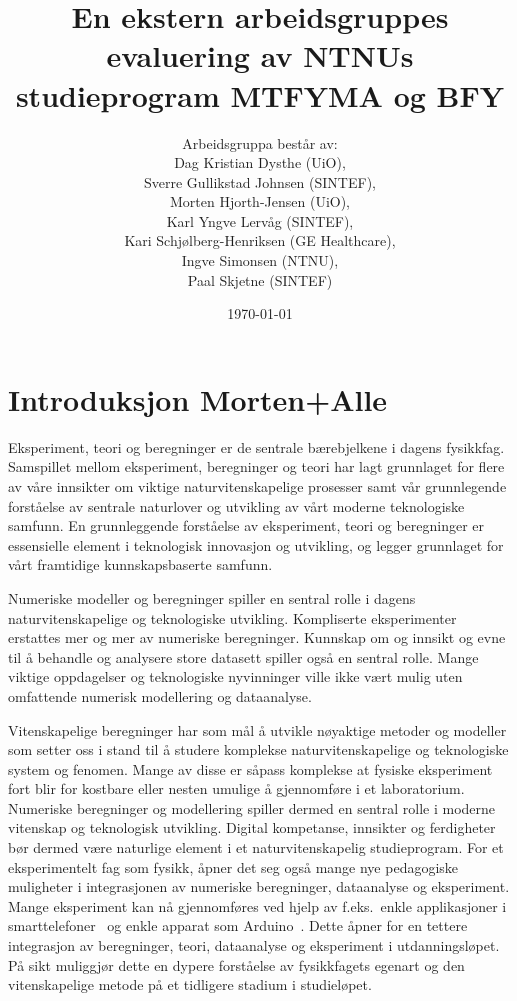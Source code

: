 \documentclass{article}
\title{En ekstern arbeidsgruppes evaluering av NTNUs studieprogram MTFYMA og BFY}
\author{Arbeidsgruppa består av: \\ Dag Kristian Dysthe (UiO), \\ Sverre Gullikstad Johnsen (SINTEF), \\ Morten Hjorth-Jensen (UiO), \\ Karl Yngve Lervåg (SINTEF), \\ Kari Schjølberg-Henriksen (GE Healthcare), \\ Ingve Simonsen (NTNU), \\ Paal Skjetne (SINTEF)}
\date{\today}
\begin{document}
\maketitle
\tableofcontents

\begin{abstract}
   
\end{abstract}

\section{Introduksjon {\color{red} Morten+Alle}} 
Eksperiment, teori og beregninger er de sentrale bærebjelkene i dagens fysikkfag. Samspillet mellom  eksperiment, beregninger og teori har lagt grunnlaget for flere av våre innsikter om  viktige naturvitenskapelige prosesser  samt vår grunnlegende forståelse av sentrale naturlover og utvikling av vårt moderne teknologiske samfunn.
En grunnleggende forståelse av eksperiment, teori og beregninger er essensielle element i teknologisk innovasjon og utvikling, og legger grunnlaget for vårt framtidige kunnskapsbaserte samfunn. 

Numeriske modeller og beregninger spiller en sentral rolle i dagens naturvitenskapelige og teknologiske utvikling. Kompliserte eksperimenter erstattes mer og mer av numeriske beregninger. Kunnskap om og innsikt og evne til å behandle og analysere store datasett spiller også en sentral rolle. Mange viktige oppdagelser og teknologiske nyvinninger ville ikke vært mulig uten omfattende numerisk modellering og dataanalyse.  

Vitenskapelige beregninger har som mål å utvikle nøyaktige metoder og modeller som setter oss i stand til å studere komplekse naturvitenskapelige og teknologiske system og fenomen. Mange av disse er såpass komplekse at fysiske eksperiment fort blir for kostbare eller nesten umulige å gjennomføre i et laboratorium. Numeriske beregninger og modellering spiller dermed en sentral rolle i moderne vitenskap og teknologisk utvikling. 
Digital kompetanse, innsikter og ferdigheter bør dermed være naturlige element i et naturvitenskapelig studieprogram. For et eksperimentelt fag som fysikk, åpner det seg også mange nye pedagogiske muligheter i integrasjonen av numeriske beregninger, dataanalyse og eksperiment. Mange eksperiment kan nå gjennomføres ved hjelp av f.eks.\ enkle applikasjoner i smarttelefoner~\cite{phyphox} og enkle apparat som Arduino~\cite{arduino}. Dette åpner for en tettere integrasjon av beregninger, teori, dataanalyse og eksperiment i utdanningsløpet. På sikt muliggjør dette en dypere forståelse av fysikkfagets egenart og den vitenskapelige metode på et tidligere stadium i studieløpet.
\end{document}
